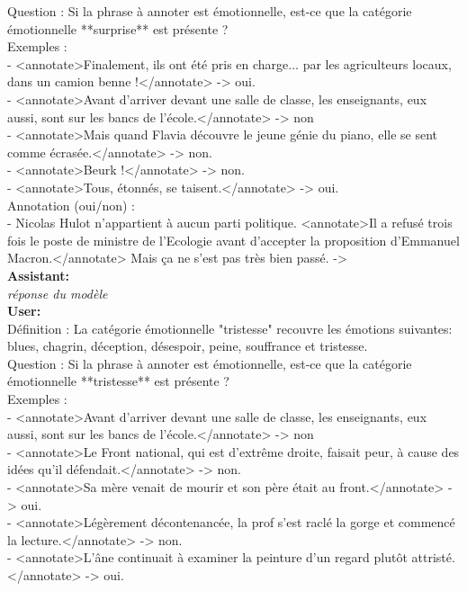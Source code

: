 {Question : Si la phrase à annoter est émotionnelle, est-ce que la catégorie émotionnelle **surprise** est présente ?\\

Exemples :\\
- <annotate>Finalement, ils ont été pris en charge... par les agriculteurs locaux, dans un camion benne !</annotate> -> oui.\\
- <annotate>Avant d'arriver devant une salle de classe, les enseignants, eux aussi, sont sur les bancs de l'école.</annotate> -> non\\
- <annotate>Mais quand Flavia découvre le jeune génie du piano, elle se sent comme écrasée.</annotate> -> non.\\
- <annotate>Beurk !</annotate> -> non.\\
- <annotate>Tous, étonnés, se taisent.</annotate> -> oui.\\

Annotation (oui/non) :\\
- Nicolas Hulot n’appartient à aucun parti politique. <annotate>Il a refusé trois fois le poste de ministre de l’Ecologie avant d’accepter la proposition d’Emmanuel Macron.</annotate> Mais ça ne s’est pas très bien passé.  -> \\

\textbf{Assistant:}\\
\textit{réponse du modèle}\\

\textbf{User:}\\
Définition : La catégorie émotionnelle "tristesse" recouvre les émotions suivantes: blues, chagrin, déception, désespoir, peine, souffrance et tristesse.\\

Question : Si la phrase à annoter est émotionnelle, est-ce que la catégorie émotionnelle **tristesse** est présente ?\\

Exemples :\\
- <annotate>Avant d'arriver devant une salle de classe, les enseignants, eux aussi, sont sur les bancs de l'école.</annotate> -> non\\
- <annotate>Le Front national, qui est d'extrême droite, faisait peur, à cause des idées qu'il défendait.</annotate> -> non.\\
- <annotate>Sa mère venait de mourir et son père était au front.</annotate> -> oui.\\
- <annotate>Légèrement décontenancée, la prof s'est raclé la gorge et commencé la lecture.</annotate> -> non.\\
- <annotate>L'âne continuait à examiner la peinture d'un regard plutôt attristé.</annotate> -> oui.

}
